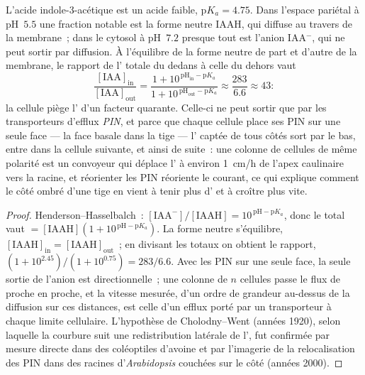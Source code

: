\begin{theorem}\label{thm:b3:plant-molecular-physiology:auxin}
L'acide indole-3-acétique est un acide faible, $\mathrm{p}K_{a} = 4.75$.
Dans l'espace pariétal à pH~$5.5$ une fraction notable est la forme
neutre IAAH, qui diffuse au travers de la membrane~; dans le cytosol à
pH~$7.2$ presque tout est l'anion IAA$^{-}$, qui ne peut sortir par
diffusion. À l'équilibre de la forme neutre de part et d'autre de la
membrane, le rapport de l' totale du dedans à celle du dehors vaut
\[
\frac{[\text{IAA}]_{\text{in}}}{[\text{IAA}]_{\text{out}}}
= \frac{1 + 10^{\,\mathrm{pH}_{\text{in}} - \mathrm{p}K_{a}}}{1 + 10^{\,\mathrm{pH}_{\text{out}} - \mathrm{p}K_{a}}}
\approx \frac{283}{6.6} \approx 43 :
\]
la cellule piège l' d'un facteur quarante. Celle-ci ne peut sortir
que par les transporteurs d'efflux \emph{PIN}, et parce que chaque
cellule place ses PIN sur une seule face --- la face basale dans la tige
--- l' captée de tous côtés sort par le bas, entre dans la cellule
suivante, et ainsi de suite~: une colonne de cellules de même polarité
est un convoyeur qui déplace l' à environ \qty{1}{cm/h} de
l'apex caulinaire vers la racine, et réorienter les PIN réoriente le
courant, ce qui explique comment le côté ombré d'une tige en vient à
tenir plus d' et à croître plus vite.
\end{theorem}
\begin{proof}
Henderson--Hasselbalch~: $[\text{IAA}^{-}]/[\text{IAAH}] = 10^{\,\mathrm{pH}
- \mathrm{p}K_{a}}$, donc le total vaut $= [\text{IAAH}](1 + 10^{\,\mathrm{pH} -
\mathrm{p}K_{a}})$. La forme neutre s'équilibre, $[\text{IAAH}]_{\text{in}}
= [\text{IAAH}]_{\text{out}}$~; en divisant les totaux on obtient le rapport,
$(1 + 10^{2.45})/(1 + 10^{0.75}) = 283/6.6$. Avec les PIN sur une seule
face, la seule sortie de l'anion est directionnelle~; une colonne de $n$
cellules passe le flux de proche en proche, et la vitesse mesurée, d'un
ordre de grandeur au-dessus de la diffusion sur ces distances, est celle
d'un efflux porté par un transporteur à chaque limite cellulaire.
L'hypothèse de Cholodny--Went (années 1920), selon laquelle la courbure
suit une redistribution latérale de l', fut confirmée par mesure
directe dans des coléoptiles d'avoine et par l'imagerie de la
relocalisation des PIN dans des racines d'\emph{Arabidopsis} couchées
sur le côté (années 2000).
\end{proof}

